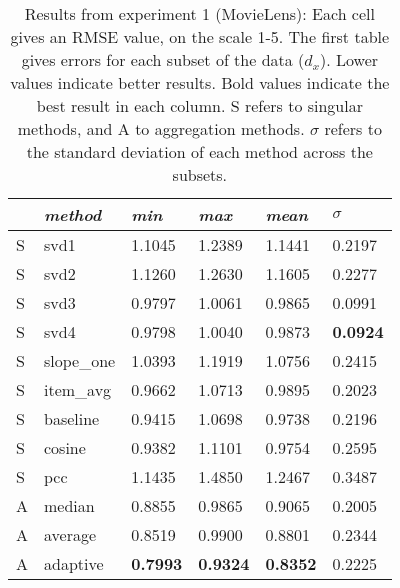 \begin{table}[p]
  \begin{tabular*}{\textwidth}{ l p{3cm} p{2cm} p{2cm} p{2cm} p{2cm} }
    \toprule
      ~ & \emph{method} & 
      \emph{min} & \emph{max} & \emph{mean} & $\sigma$\\
    \midrule
    S & svd1          & 1.1045	& 1.2389	& 1.1441	& 0.2197 \\
    S & svd2          & 1.1260	& 1.2630	& 1.1605	& 0.2277 \\
    S & svd3          & 0.9797	& 1.0061	& 0.9865	& 0.0991 \\
    S & svd4          & 0.9798	& 1.0040	& 0.9873	& \textbf{0.0924} \\
    S & slope\_one    & 1.0393	& 1.1919	& 1.0756	& 0.2415 \\
    S & item\_avg     & 0.9662	& 1.0713	& 0.9895	& 0.2023 \\
    S & baseline       & 0.9415	& 1.0698	& 0.9738	& 0.2196 \\
    S & cosine   	    & 0.9382	& 1.1101	& 0.9754	& 0.2595 \\
    S & pcc       	  & 1.1435	& 1.4850	& 1.2467	& 0.3487 \\
    \midrule            
    A & median    	  & 0.8855	& 0.9865	& 0.9065	& 0.2005 \\
    A & average    	  & 0.8519	& 0.9900	& 0.8801	& 0.2344 \\
    A & adaptive       & \textbf{0.7993}	& \textbf{0.9324}	& \textbf{0.8352}	& 0.2225 \\
    \bottomrule
  \end{tabular*}
  \vspace{2em}

  \caption[Results from Experiment 1]{
    Results from experiment 1 (MovieLens):
    Each cell gives an RMSE value, on the scale 1-5.
    The first table gives errors for each subset of the data ($d_x$).
    Lower values indicate better results.
    Bold values indicate the best result in each column.
    S refers to singular methods, and A to aggregation methods.
    $\sigma$ refers to the standard deviation of each method across the subsets.
  }
  \label{table:results:e1}
\end{table}

